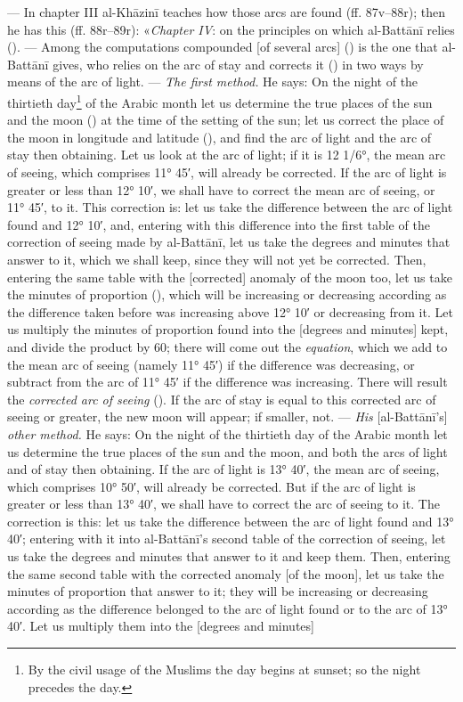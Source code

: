 \documentclass[11pt]{article}
\newcommand{\Pg}[1]{\marginpar{\footnotesize\color{gray}#1}}
\begin{document}
\par \Pg{I 270}— In chapter III al-Khāzinī teaches how those arcs are found (ff. 87v–88r); then he has this (ff. 88r–89r): «\emph{Chapter IV}: on the principles on which al-Battānī relies (). — Among the computations compounded [of several arcs] () is the one that al-Battānī gives, who relies on the arc of stay and corrects it () in two ways by means of the arc of light. — \emph{The first method.} He says: On the night of the thirtieth day\footnote{By the civil usage of the Muslims the day begins at sunset; so the night precedes the day.} of the Arabic month let us determine the true places of the sun and the moon () at the time of the setting of the sun; let us correct the place of the moon in longitude and latitude (), and find the arc of light and the arc of stay then obtaining. Let us look at the arc of light; if it is 12 1/6°, the mean arc of seeing, which comprises 11° 45′, will already be corrected. If the arc of light is greater or less than 12° 10′, we shall have to correct the mean arc of seeing, or 11° 45′, to it. This correction is: let us take the difference between the arc of light found and 12° 10′, and, entering with this difference into the first table of the correction of seeing made by al-Battānī, let us take the degrees and minutes that answer to it, which we shall keep, since they will not yet be corrected. Then, entering the same table with the [corrected] anomaly of the moon too, let us take the minutes of proportion (), which will be increasing or decreasing according as the difference taken before was increasing above 12° 10′ or decreasing from it. Let us multiply the minutes of proportion found into the [degrees and minutes] kept, and divide the product by 60; there will come out the \emph{equation}, which we add to the mean arc of seeing (namely 11° 45′) if the difference was decreasing, or subtract from the arc of 11° 45′ if the difference was increasing. There will result the \emph{corrected arc of seeing} (). If the arc of stay is equal to this corrected arc of seeing or greater, the new moon will appear; if smaller, not. — \emph{His} [al-Battānī's] \emph{other method.} He says: On the night of the thirtieth day of the Arabic month let us determine the true places of the sun and the moon, and both the arcs of light and of stay then obtaining. If the arc of light is 13° 40′, the mean arc of seeing, which comprises 10° 50′, will already be corrected. But if the arc of light is greater or less than 13° 40′, we shall have to correct the arc of seeing to it. The correction is this: let us take the difference between the arc of light found and 13° 40′; entering with it into al-Battānī's second table of the correction of seeing, let us take the degrees and minutes that answer to it and keep them. Then, entering the same second table with the corrected anomaly [of the moon], let us take the minutes of proportion that answer to it; they will be increasing or decreasing according as the difference belonged to the arc of light found or to the arc of 13° 40′. Let us multiply them into the [degrees and minutes] 
\end{document}
